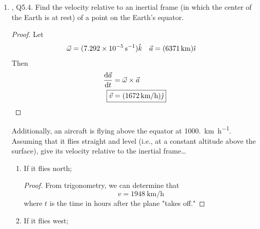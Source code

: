 \documentclass[../psets.tex]{subfiles}
\begin{document}
\begin{enumerate}
\begin{enumerate}
\begin{proof}
\begin{align*}
                &= 2\int_{r_\text{min}}^\infty\frac{mvb/r^2}{\sqrt{2m(mv^2/2-V(r)-(mvb)^2/2mr^2)}}\dd{r}\\
                &= 2\int_{r_\text{min}}^\infty\frac{mvb/r^2}{\sqrt{m^2v^2(1-V(r)\cdot 2/mv^2-b^2/r^2)}}\dd{r}\\
                &= 2\int_{r_\text{min}}^\infty\frac{b/r^2}{\sqrt{1-V(r)/E-b^2/r^2}}\dd{r}
            \end{align*}
            It follows that
            \begin{equation*}
                \boxed{\Theta = \pi-2\int_{r_\text{min}}^\infty\frac{b/r^2}{\sqrt{1-V(r)/E-b^2/r^2}}\dd{r}}
            \end{equation*}
        \end{proof}
    \end{enumerate}
    \item \textcite{bib:KibbleBerkshire}, Q5.4. Find the velocity relative to an inertial frame (in which the center of the Earth is at rest) of a point on the Earth's equator.
    \begin{proof}
        Let
        \begin{align*}
            \vec{\omega} &= (\SI{7.292e-5}{\per\second})\hat{k}&
            \vec{a} &= (\SI{6371}{\kilo\meter})\hat{\imath}
        \end{align*}
        Then
        \begin{align*}
            \dv{\vec{a}}{t} &= \vec{\omega}\times\vec{a}\\
            \Aboxed{\vec{v} &= (\SI[per-mode=symbol]{1672}{\kilo\meter\per\hour})\jhat}
        \end{align*}
    \end{proof}
    Additionally, an aircraft is flying above the equator at \SI[per-mode=symbol]{1000.}{\kilo\meter\per\hour}. Assuming that it flies straight and level (i.e., at a constant altitude above the surface), give its velocity relative to the inertial frame\dots
    \begin{enumerate}
        \item If it flies north;
        \begin{proof}
            From trigonometry, we can determine that
            \begin{equation*}
                \boxed{v = \SI{1948}{\kilo\meter\per\hour}}
            \end{equation*}
            where $t$ is the time in hours after the plane "takes off."
        \end{proof}
        \item If it flies west;

\end{enumerate}
\end{enumerate}
\end{document}
